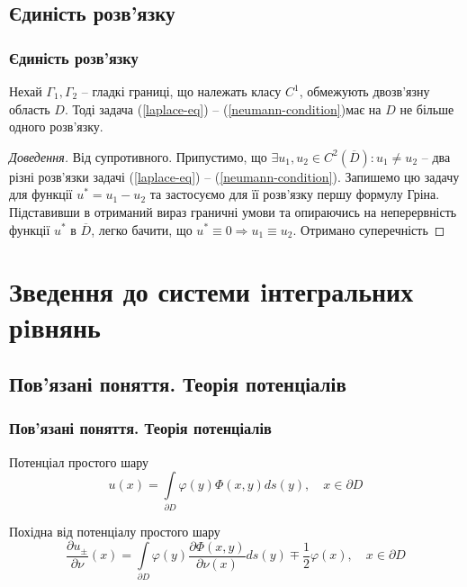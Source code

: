 \documentclass{beamer}
\numberwithin{equation}{section}
\newcommand{\intl}{\int\limits}
\newcommand{\boundprob}{(\ref{laplace-eq}) -- (\ref{neumann-condition})}
\begin{document}
	\subsection{Єдиність розв'язку}
	\begin{frame}
		\frametitle{Єдиність розв'язку}
		
		\begin{theorem}
			Нехай $\Gamma_{1}, \Gamma_{2}$ -- гладкі границі, що належать класу $C^1$, обмежують двозв'язну область $D$. Тоді задача \boundprob \space має на $D$ не більше одного розв'язку.
		\end{theorem}
		
		\begin{proof}[Доведення]
			Від супротивного. Припустимо, що $\exists u_1, u_2 \in C^{2}(\overline{D}): u_1 \neq u_2 $ -- два різні розв'язки задачі \boundprob. Запишемо цю задачу для функції $u^* = u_1 - u_2$
			та застосуємо для її розв'язку першу формулу Гріна. Підставивши в отриманий вираз граничні умови та опираючись на неперервність функції $u^*$ в $\overline{D}$, легко бачити, що $u^*\equiv0 \Rightarrow u_1\equiv u_2$. Отримано суперечність
		\end{proof}
		
		
		
		
	\end{frame}

	\section{Зведення до системи iнтегральних рiвнянь} 	

	\subsection{Пов'язані поняття. Теорія потенціалів}
	\begin{frame}
		\frametitle{Пов'язані поняття. Теорія потенціалів}
		\begin{block}{Потенціал простого шару}
			$$
			u(x)=\intl_{\partial D} \varphi(y) \Phi(x, y) d s(y), \quad x \in \partial D
			$$
		\end{block}
		\vspace{0.8cm}
		\begin{block}{Похідна від потенціалу простого шару}
			$$
			\frac{\partial u_{\pm}}{\partial \nu}(x) =
			\intl_{\partial D} \varphi(y) \frac{\partial \Phi(x, y)}{\partial \nu(x)} d s(y) \mp \frac{1}{2} \varphi(x),
			\quad x \in \partial D
			$$
		\end{block}
	\end{frame}
\end{document}
